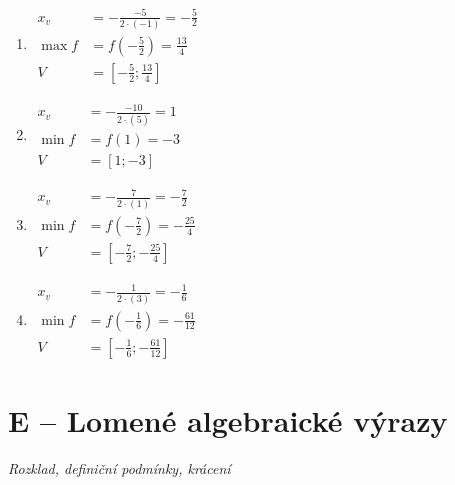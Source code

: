 \documentclass[11pt,a4paper]{article}
\begin{document}
\begin{enumerate}[label={},itemsep=9pt]
\item[\textbf{D017}] \(\displaystyle \begin{aligned}x_v&=-\frac{-5}{2\cdot(-1)}=- \frac{5}{2}\\\max f&=f(- \frac{5}{2})=\frac{13}{4}\\V&=[- \frac{5}{2};\frac{13}{4}]\end{aligned}\)\par
\item[\textbf{D018}] \(\displaystyle \begin{aligned}x_v&=-\frac{-10}{2\cdot(5)}=1\\\min f&=f(1)=-3\\V&=[1;-3]\end{aligned}\)\par
\item[\textbf{D019}] \(\displaystyle \begin{aligned}x_v&=-\frac{7}{2\cdot(1)}=- \frac{7}{2}\\\min f&=f(- \frac{7}{2})=- \frac{25}{4}\\V&=[- \frac{7}{2};- \frac{25}{4}]\end{aligned}\)\par
\item[\textbf{D020}] \(\displaystyle \begin{aligned}x_v&=-\frac{1}{2\cdot(3)}=- \frac{1}{6}\\\min f&=f(- \frac{1}{6})=- \frac{61}{12}\\V&=[- \frac{1}{6};- \frac{61}{12}]\end{aligned}\)\par
\end{enumerate}
\section*{E -- Lomené algebraické výrazy}
\textit{Rozklad, definiční podmínky, krácení}
\end{document}
